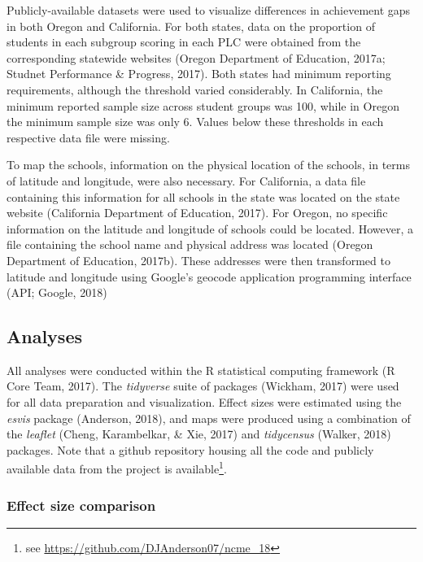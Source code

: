 \documentclass[man, fleqn, noextraspace]{apa6}
\theoremstyle{definition}
\theoremstyle{definition}
\theoremstyle{definition}
\theoremstyle{remark}
\begin{document}
Publicly-available datasets were used to visualize differences in
achievement gaps in both Oregon and California. For both states, data on
the proportion of students in each subgroup scoring in each PLC were
obtained from the corresponding statewide websites (Oregon Department of
Education, 2017a; Studnet Performance \& Progress, 2017). Both states
had minimum reporting requirements, although the threshold varied
considerably. In California, the minimum reported sample size across
student groups was 100, while in Oregon the minimum sample size was only
6. Values below these thresholds in each respective data file were
missing.

To map the schools, information on the physical location of the schools,
in terms of latitude and longitude, were also necessary. For California,
a data file containing this information for all schools in the state was
located on the state website (California Department of Education, 2017).
For Oregon, no specific information on the latitude and longitude of
schools could be located. However, a file containing the school name and
physical address was located (Oregon Department of Education, 2017b).
These addresses were then transformed to latitude and longitude using
Google's geocode application programming interface (API; Google, 2018)

\hypertarget{analyses}{%
\subsection{Analyses}\label{analyses}}

All analyses were conducted within the R statistical computing framework
(R Core Team, 2017). The \emph{tidyverse} suite of packages (Wickham,
2017) were used for all data preparation and visualization. Effect sizes
were estimated using the \emph{esvis} package (Anderson, 2018), and maps
were produced using a combination of the \emph{leaflet} (Cheng,
Karambelkar, \& Xie, 2017) and \emph{tidycensus} (Walker, 2018)
packages. Note that a github repository housing all the code and
publicly available data from the project is available\footnote{see
  \url{https://github.com/DJAnderson07/ncme_18}}.

\hypertarget{effect-size-comparison}{%
\subsubsection{Effect size comparison}\label{effect-size-comparison}}
\end{document}
